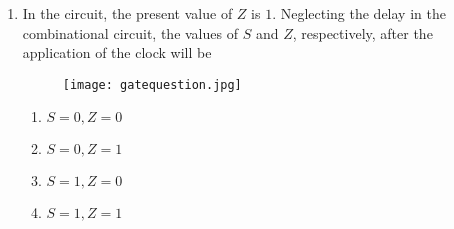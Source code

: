 \documentclass {article}
\begin{document}
                                                  
\begin {enumerate}
        \item In the circuit, the present value of $Z$ is $1$. Neglecting the delay in the combinational circuit, the values of $S$ and $Z$, respectively, after the application of the clock will be                  
	\begin {figure} [h!]
                \centering
                \texttt{[image: gatequestion.jpg]}
                \end {figure}
           \begin {enumerate}

           \item $S = 0, Z = 0$
           \item $S = 0, Z = 1$
           \item $S = 1, Z = 0$
           \item $S = 1, Z = 1$
           \end {enumerate}
\end {enumerate}
\end{document}
